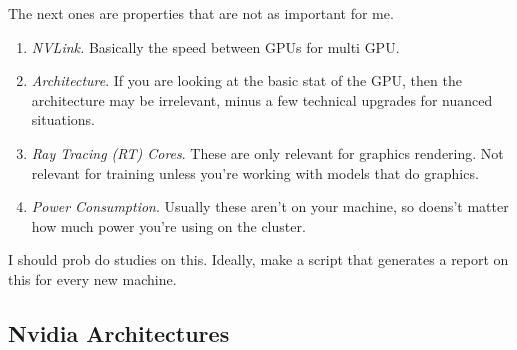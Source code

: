   The next ones are properties that are not as important for me. 

  \begin{enumerate}
    \item \textit{NVLink. } Basically the speed between GPUs for multi GPU. 

    \item \textit{Architecture}. If you are looking at the basic stat of the GPU, then the architecture may be irrelevant, minus a few technical upgrades for nuanced situations. 

    \item \textit{Ray Tracing (RT) Cores}. These are only relevant for graphics rendering. Not relevant for training unless you're working with models that do graphics. 

    \item \textit{Power Consumption}. Usually these aren't on your machine, so doens't matter how much power you're using on the cluster. 

  \end{enumerate}

  I should prob do studies on this. Ideally, make a script that generates a report on this for every new machine. 

\subsection{Nvidia Architectures} 

  



